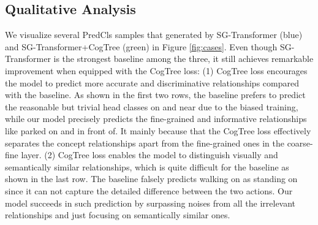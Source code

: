 \documentclass[letterpaper]{article} \usepackage{aaai21}  \usepackage{times}  \usepackage{helvet} \usepackage{courier}  \usepackage[hyphens]{url}  \usepackage{graphicx} \urlstyle{rm} \def\UrlFont{\rm}  \usepackage{natbib}  \usepackage{caption} \frenchspacing  \setlength{\pdfpagewidth}{8.5in}  \setlength{\pdfpageheight}{11in}  \usepackage{amsmath,amsthm}
\begin{document}
\subsection{Qualitative Analysis}
We visualize several PredCls samples that generated by SG-Transformer (blue) and SG-Transformer+CogTree (green) in Figure \ref{fig:cases}. Even though SG-Transformer is the strongest baseline among the three, it still achieves remarkable improvement when equipped with the CogTree loss: (1) CogTree loss encourages the model to predict more accurate and discriminative relationships compared with the baseline. As shown in the first two rows, the baseline prefers to predict the reasonable but trivial head classes  {\ttfamily on} and  {\ttfamily near} due to the biased training, while our model precisely predicts the fine-grained and informative relationships like  {\ttfamily parked on} 
and {\ttfamily in front of}. It mainly because that the CogTree loss effectively separates the concept relationships apart from the fine-grained ones in the coarse-fine layer. (2) CogTree loss enables the model to distinguish visually and semantically similar relationships, which is quite difficult for the baseline as shown in the last row. The baseline falsely predicts  {\ttfamily walking on} as {\ttfamily standing on} since it can not capture the detailed difference between the two actions. Our model succeeds in such prediction 
by surpassing noises from all the irrelevant relationships and just focusing on semantically similar ones.
\end{document}

